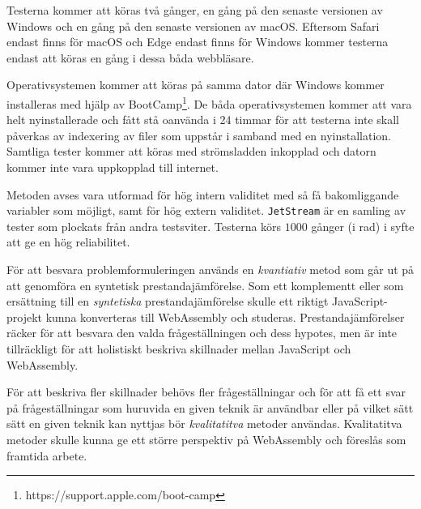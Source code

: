 \documentclass[swedish,template=rapport]{his}
\begin{document}
Testerna kommer att köras två gånger, en gång på den senaste versionen av Windows och en gång på den senaste versionen av macOS. Eftersom Safari endast finns för macOS och Edge endast finns för Windows kommer testerna endast att köras en gång i dessa båda webbläsare.

Operativsystemen kommer att köras på samma dator där Windows kommer installeras med hjälp av BootCamp\footnote{https://support.apple.com/boot-camp}. De båda operativsystemen kommer att vara helt nyinstallerade och fått stå oanvända i 24 timmar för att testerna inte skall påverkas av indexering av filer som uppstår i samband med en nyinstallation. Samtliga tester kommer att köras med strömsladden inkopplad och datorn kommer inte vara uppkopplad till internet. 

Metoden avses vara utformad för hög intern validitet med så få bakomliggande variabler som möjligt, samt för hög extern validitet. \texttt{JetStream} är en samling av tester som plockats från andra testsviter. Testerna körs $1 000$ gånger (i rad) i syfte att ge en hög reliabilitet.

För att besvara problemformuleringen används en \emph{kvantiativ} metod som går ut på att genomföra en syntetisk prestandajämförelse. Som ett komplementt eller som ersättning till en \emph{syntetiska} prestandajämförelse skulle ett riktigt JavaScript-projekt kunna konverteras till WebAssembly och studeras. Prestandajämförelser räcker för att besvara den valda frågeställningen och dess hypotes, men är inte tillräckligt för att holistiskt beskriva skillnader mellan JavaScript och WebAssembly.  

För att beskriva fler skillnader behövs fler frågeställningar och för att få ett svar på frågeställningar som huruvida en given teknik är användbar eller på vilket sätt sätt en given teknik kan nyttjas bör \emph{kvalitatitva} metoder användas. Kvalitatitva metoder skulle kunna ge ett större perspektiv på WebAssembly och föreslås som framtida arbete.

\clearpage

\printbibliography[heading=bibintoc]
\end{document}
